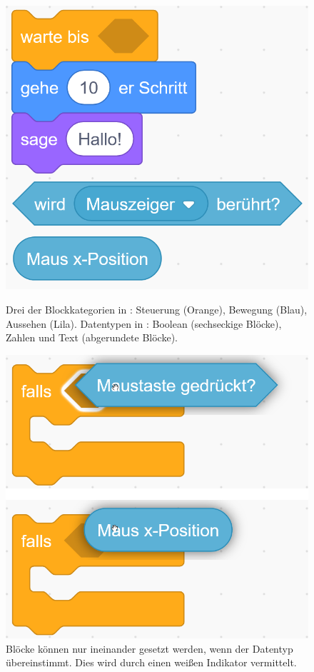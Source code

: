 \begin{figure}[!ht]
  \includegraphics[width=\linewidth]{assets/scratch-types.png}
  \caption{Drei der Blockkategorien in \Scratch{}: Steuerung (Orange), Bewegung (Blau), Aussehen (Lila). Datentypen in \Scratch{}: Boolean (sechseckige Blöcke), Zahlen und Text (abgerundete Blöcke). }
  \label{fig:scratch-types}
  \endminipage
  \hfill
  \includegraphics[width=\linewidth]{assets/scratch-drop.png}
  \caption{Blöcke können nur ineinander gesetzt werden, wenn der Datentyp übereinstimmt. Dies wird durch einen weißen Indikator vermittelt. }
  \label{fig:scratch-drop}
  \endminipage
\end{figure}


